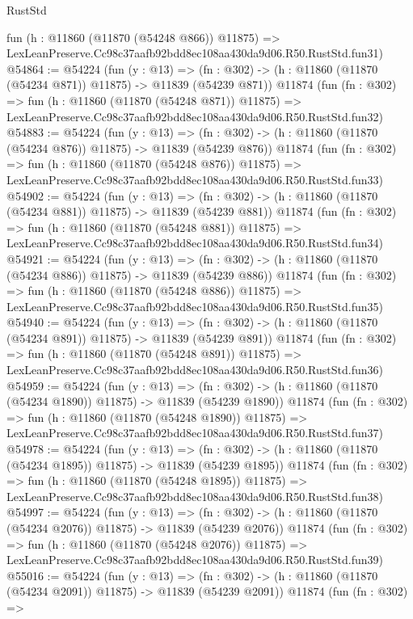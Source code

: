 \begin{lexlean}{RustStd}
\begin{coremodule}
    fun (h : @11860 (@11870 (@54248 @866)) @11875) =>
    LexLeanPreserve.Cc98c37aafb92bdd8ec108aa430da9d06.R50.RustStd.fun31)
@54864 := @54224
    (fun (y : @13) =>
    (fn : @302) -> (h : @11860 (@11870 (@54234 @871)) @11875) -> @11839 (@54239 @871))
    @11874
    (fun (fn : @302) =>
    fun (h : @11860 (@11870 (@54248 @871)) @11875) =>
    LexLeanPreserve.Cc98c37aafb92bdd8ec108aa430da9d06.R50.RustStd.fun32)
@54883 := @54224
    (fun (y : @13) =>
    (fn : @302) -> (h : @11860 (@11870 (@54234 @876)) @11875) -> @11839 (@54239 @876))
    @11874
    (fun (fn : @302) =>
    fun (h : @11860 (@11870 (@54248 @876)) @11875) =>
    LexLeanPreserve.Cc98c37aafb92bdd8ec108aa430da9d06.R50.RustStd.fun33)
@54902 := @54224
    (fun (y : @13) =>
    (fn : @302) -> (h : @11860 (@11870 (@54234 @881)) @11875) -> @11839 (@54239 @881))
    @11874
    (fun (fn : @302) =>
    fun (h : @11860 (@11870 (@54248 @881)) @11875) =>
    LexLeanPreserve.Cc98c37aafb92bdd8ec108aa430da9d06.R50.RustStd.fun34)
@54921 := @54224
    (fun (y : @13) =>
    (fn : @302) -> (h : @11860 (@11870 (@54234 @886)) @11875) -> @11839 (@54239 @886))
    @11874
    (fun (fn : @302) =>
    fun (h : @11860 (@11870 (@54248 @886)) @11875) =>
    LexLeanPreserve.Cc98c37aafb92bdd8ec108aa430da9d06.R50.RustStd.fun35)
@54940 := @54224
    (fun (y : @13) =>
    (fn : @302) -> (h : @11860 (@11870 (@54234 @891)) @11875) -> @11839 (@54239 @891))
    @11874
    (fun (fn : @302) =>
    fun (h : @11860 (@11870 (@54248 @891)) @11875) =>
    LexLeanPreserve.Cc98c37aafb92bdd8ec108aa430da9d06.R50.RustStd.fun36)
@54959 := @54224
    (fun (y : @13) =>
    (fn : @302) -> (h : @11860 (@11870 (@54234 @1890)) @11875) -> @11839 (@54239 @1890))
    @11874
    (fun (fn : @302) =>
    fun (h : @11860 (@11870 (@54248 @1890)) @11875) =>
    LexLeanPreserve.Cc98c37aafb92bdd8ec108aa430da9d06.R50.RustStd.fun37)
@54978 := @54224
    (fun (y : @13) =>
    (fn : @302) -> (h : @11860 (@11870 (@54234 @1895)) @11875) -> @11839 (@54239 @1895))
    @11874
    (fun (fn : @302) =>
    fun (h : @11860 (@11870 (@54248 @1895)) @11875) =>
    LexLeanPreserve.Cc98c37aafb92bdd8ec108aa430da9d06.R50.RustStd.fun38)
@54997 := @54224
    (fun (y : @13) =>
    (fn : @302) -> (h : @11860 (@11870 (@54234 @2076)) @11875) -> @11839 (@54239 @2076))
    @11874
    (fun (fn : @302) =>
    fun (h : @11860 (@11870 (@54248 @2076)) @11875) =>
    LexLeanPreserve.Cc98c37aafb92bdd8ec108aa430da9d06.R50.RustStd.fun39)
@55016 := @54224
    (fun (y : @13) =>
    (fn : @302) -> (h : @11860 (@11870 (@54234 @2091)) @11875) -> @11839 (@54239 @2091))
    @11874
    (fun (fn : @302) =>

\end{coremodule}
\end{lexlean}
